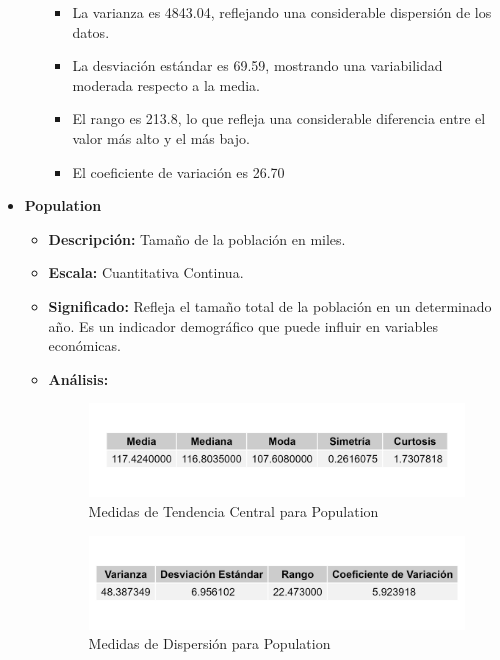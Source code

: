 \documentclass{article}
\begin{document}
\begin{itemize}
\begin{itemize}
\begin{itemize}
                \item La varianza es 4843.04, reflejando una considerable dispersión de los datos.
                \item La desviación estándar es 69.59, mostrando una variabilidad moderada respecto a la media.
                \item El rango es 213.8, lo que refleja una considerable diferencia entre el valor más alto y el más bajo.
                \item El coeficiente de variación es 26.70%
            \end{itemize}
    \end{itemize}
    
    \item \textbf{Population}
    \begin{itemize}
        \item \textbf{Descripción:} Tamaño de la población en miles.
        \item \textbf{Escala:} Cuantitativa Continua.
        \item \textbf{Significado:} Refleja el tamaño total de la población en un determinado año. Es un indicador demográfico que puede influir en variables económicas.
        \item \textbf{Análisis:} 
        \begin{figure}[H]
            \centering
            \includegraphics[width=\textwidth]{MTC/Population_central.png}
            \caption{Medidas de Tendencia Central para Population}
        \end{figure}
        \begin{figure}[H]
            \centering
            \includegraphics[width=\textwidth]{MTC/Population_dispersion.png}
            \caption{Medidas de Dispersión para Population}

\end{figure}
\end{itemize}
\end{itemize}
\end{document}
